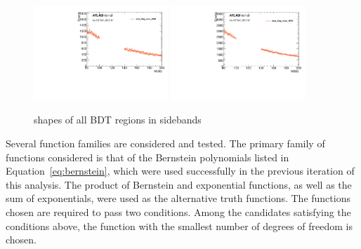 \begin{figure}[htbp]
 \includegraphics[width=0.45\textwidth]{figures/VBF/Mbb_SRIII_4cen.pdf}
 \includegraphics[width=0.45\textwidth]{figures/VBF/Mbb_SRIV_4cen.pdf}\\
\caption{\Mbb{} shapes of all BDT regions in sidebands} 
  \label{fig:vbf-mbb_sidebands}
\end{figure}


Several function families are considered and tested. The primary family of functions considered is that of the Bernstein polynomials listed in Equation~\ref{eq:bernstein}, which were
used successfully in the previous iteration of this analysis. The product of Bernstein and exponential functions, as well as the sum of exponentials, were used as the alternative truth functions.
The functions chosen are required to pass two conditions. Among the candidates satisfying the conditions above, the function with the smallest number of degrees of freedom is chosen.


